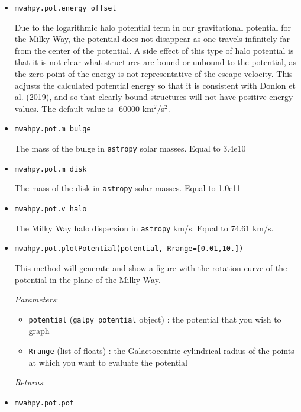 \documentclass{article}
\begin{document}
\begin{itemize}

\item \verb!mwahpy.pot.energy_offset!

Due to the logarithmic halo potential term in our gravitational potential for the Milky Way, the potential does not disappear as one travels infinitely far from the center of the potential. A side effect of this type of halo potential is that it is not clear what structures are bound or unbound to the potential, as the zero-point of the energy is not representative of the escape velocity. This adjusts the calculated potential energy so that it is consistent with Donlon et al. (2019), and so that clearly bound structures will not have positive energy values. The default value is -60000 km$^2$/s$^2$. 

\item \verb!mwahpy.pot.m_bulge!

The mass of the bulge in \verb!astropy! solar masses. Equal to 3.4e10 \msol

\item \verb!mwahpy.pot.m_disk!

The mass of the disk in \verb!astropy! solar masses. Equal to 1.0e11 \msol

\item \verb!mwahpy.pot.v_halo!

The Milky Way halo dispersion in \verb!astropy! km/s. Equal to 74.61 km/s.

\item \verb!mwahpy.pot.plotPotential(potential, Rrange=[0.01,10.])!

This method will generate and show a figure with the rotation curve of the potential in the plane of the Milky Way. 

\textit{Parameters}: \begin{itemize}

\item \verb!potential! (\verb!galpy potential! object) : the potential that you wish to graph 

\item \verb!Rrange! (list of floats) : the Galactocentric cylindrical radius of the points at which you want to evaluate the potential

\end{itemize}

\textit{Returns}: 

\item \verb!mwahpy.pot.pot!


\end{itemize}
\end{document}
